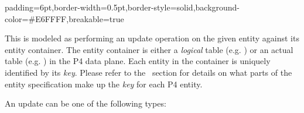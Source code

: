 \documentclass[11pt]{article}
\begin{document}
{%
\begin{mdbmargintb}{6pt}{6pt}%
\begin{mdblock}{padding=6pt,border-width=0.5pt,border-style=solid,background-color=\#E6FFFF,breakable=true}%
\begin{mdpre}%
\end{mdpre}%
\end{mdblock}%
\end{mdbmargintb}%

\noindent{}This is modeled as performing an update operation on the given entity against
its entity container. The entity container is either a \emph{logical} table (e.g.
) or an actual table (e.g. ) in the P4 data
plane. Each entity in the container is uniquely identified by its \emph{key}. Please
refer to the~ section for details on
what parts of the entity specification make up the \emph{key} for each P4 entity.%

An update can be one of the following types:%

\begin{itemize}%


\end{itemize}}
\end{document}
